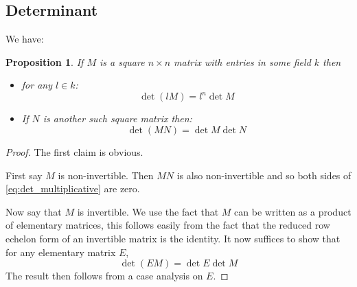 \documentclass[12pt]{article}
\theoremstyle{plain}
\newtheorem{proposition}[thm]{Proposition}
\theoremstyle{definition}
\begin{document}
\subsection{Determinant}
We have:
\begin{proposition}
If $M$ is a square $n \times n$ matrix with entries in some field $k$ then
\begin{itemize}
\item for any $l \in k$:
\begin{equation}\label{eq:scalar_det}
\operatorname{det}(l M) = l^n \operatorname{det}M
\end{equation}
\item If $N$ is another such square matrix then:
\begin{equation}\label{eq:det_multiplicative}
\operatorname{det}(MN) = \operatorname{det}M\operatorname{det}N
\end{equation}
\end{itemize}
\end{proposition}
\begin{proof}
The first claim is obvious.

First say $M$ is non-invertible. Then $MN$ is also non-invertible and so both sides of \eqref{eq:det_multiplicative} are zero.

Now say that $M$ is invertible. We use the fact that $M$ can be written as a product of elementary matrices, this follows easily from the fact that the reduced row echelon form of an invertible matrix is the identity. It now suffices to show that for any elementary matrix $E$,
\begin{equation}
\operatorname{det}(EM) = \operatorname{det}E\operatorname{det}M
\end{equation}
The result then follows from a case analysis on $E$.
\end{proof}
\end{document}
